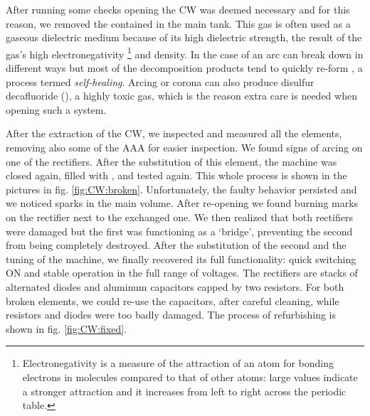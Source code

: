 \begin{refsection}
After running some checks opening the CW was deemed necessary and for this reason, we removed the  contained in the main tank. 
This gas is often used as a gaseous dielectric medium because of its high dielectric strength, the result of the gas's high electronegativity
\footnote{Electronegativity is a measure of the attraction of an atom for bonding electrons in molecules compared to that of other atoms: large values indicate a stronger attraction and it increases from left to right across the periodic table.} and density.
In the case of an arc  can break down in different ways but most of the decomposition products tend to quickly re-form , a process termed \textit{self-healing}. 
Arcing or corona can also produce disulfur decafluoride (), a highly toxic gas, which is the reason extra care is needed when opening such a system.

After the extraction of the CW, we inspected and measured all the elements, removing also some of the AAA for easier inspection. 
We found signs of arcing on one of the rectifiers. 
After the substitution of this element, the machine was closed again, filled with , and tested again.
This whole process is shown in the pictures in fig. \ref{fig:CW:broken}.
Unfortunately, the faulty behavior persisted and we noticed sparks in the main volume. 
After re-opening we found burning marks on the rectifier next to the exchanged one.
We then realized that both rectifiers were damaged but the first was functioning as a `bridge', preventing the second from being completely destroyed. 
After the substitution of the second and the tuning of the machine, we finally recovered its full functionality: quick switching ON and stable operation in the full range of voltages.
The rectifiers are stacks of alternated diodes and aluminum capacitors capped by two resistors. For both broken elements, we could re-use the capacitors, after careful cleaning, while resistors and diodes were too badly damaged. The process of refurbishing is shown in fig. \ref{fig:CW:fixed}.


\end{refsection}
